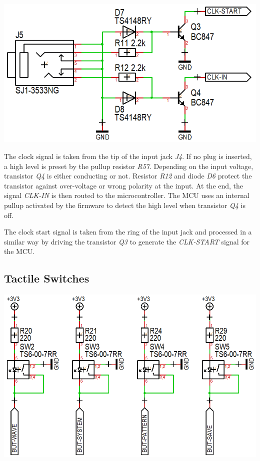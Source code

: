 \documentclass{scrartcl}
\begin{document}
\begin{center}
    \includegraphics[scale=0.35]{assets/schema-clocks.png}
\end{center}

The clock signal is taken from the tip of the input jack \emph{J4}. If no plug is inserted, a high level is preset by the pullup resistor \emph{R57}. Depending on the input voltage, transistor \emph{Q4} is either conducting or not. Resistor \emph{R12} and diode \emph{D6} protect the transistor against over-voltage or wrong polarity at the input. At the end, the signal \emph{CLK-IN} is then routed to the microcontroller. The MCU uses an internal pullup activated by the firmware to detect the high level when transistor \emph{Q4} is off.

The clock start signal is taken from the ring of the input jack and processed in a similar way by driving the transistor \emph{Q3} to generate the \emph{CLK-START} signal for the MCU.

\subsection{Tactile Switches}

\begin{center}
    \includegraphics[scale=0.35]{assets/schema-switch.png}
\end{center}
\end{document}
